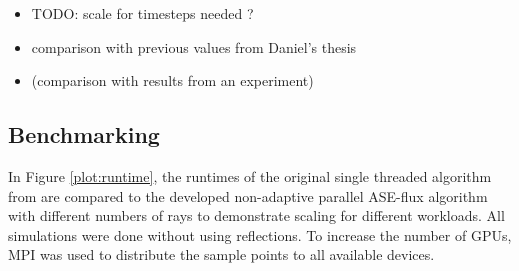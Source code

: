 \begin{itemize}
  \item TODO: scale for timesteps needed ?

  \item comparison with previous values from Daniel's thesis

  \item (comparison with results from an experiment)

\end{itemize}


\subsection{Benchmarking}
\label{subsec:benchmarking}
In Figure \ref{plot:runtime}, the runtimes of the original single threaded
algorithm from \cite{ASE2010} are compared to the developed non-adaptive
parallel ASE-flux algorithm with different numbers of rays to demonstrate
scaling for different workloads. All simulations were done without using
reflections. To increase the number of GPUs, MPI\cite{MPI} was used to distribute the
sample points to all available devices. 

